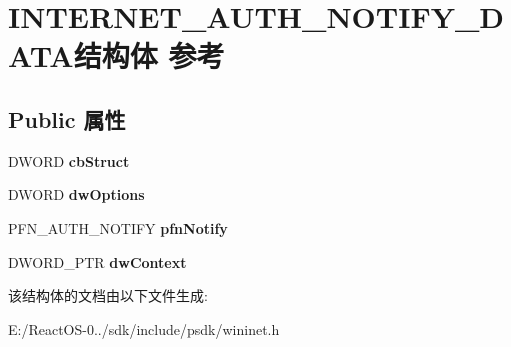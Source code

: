 \hypertarget{struct_i_n_t_e_r_n_e_t___a_u_t_h___n_o_t_i_f_y___d_a_t_a}{}\section{I\+N\+T\+E\+R\+N\+E\+T\+\_\+\+A\+U\+T\+H\+\_\+\+N\+O\+T\+I\+F\+Y\+\_\+\+D\+A\+T\+A结构体 参考}
\label{struct_i_n_t_e_r_n_e_t___a_u_t_h___n_o_t_i_f_y___d_a_t_a}
\subsection*{Public 属性}
\begin{DoxyCompactItemize}
\item 
\mbox{\label{struct_i_n_t_e_r_n_e_t___a_u_t_h___n_o_t_i_f_y___d_a_t_a_a4638388d2e195772b735ef76d3c5153e}} 
D\+W\+O\+RD {\bfseries cb\+Struct}
\item 
\mbox{\label{struct_i_n_t_e_r_n_e_t___a_u_t_h___n_o_t_i_f_y___d_a_t_a_a84b7c4ab8d00cb96a4d9e5ce4c5ca3e7}} 
D\+W\+O\+RD {\bfseries dw\+Options}
\item 
\mbox{\label{struct_i_n_t_e_r_n_e_t___a_u_t_h___n_o_t_i_f_y___d_a_t_a_aaf3f731963799e73484dd0e84796016a}} 
P\+F\+N\+\_\+\+A\+U\+T\+H\+\_\+\+N\+O\+T\+I\+FY {\bfseries pfn\+Notify}
\item 
\mbox{\label{struct_i_n_t_e_r_n_e_t___a_u_t_h___n_o_t_i_f_y___d_a_t_a_abe087588b0d20afcf907430f264675b7}} 
D\+W\+O\+R\+D\+\_\+\+P\+TR {\bfseries dw\+Context}
\end{DoxyCompactItemize}


该结构体的文档由以下文件生成\+:\begin{DoxyCompactItemize}
\item 
E\+:/\+React\+O\+S-\/0../sdk/include/psdk/wininet.\+h\end{DoxyCompactItemize}
